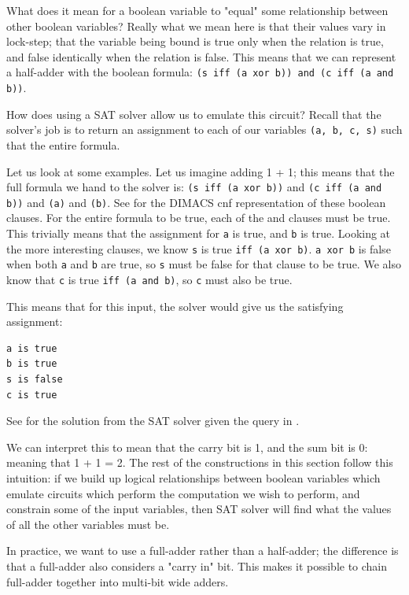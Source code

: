 What does it mean for a boolean variable to "equal" some relationship between other boolean variables? Really what we mean here is that their values vary in lock-step; that the variable being bound is true only when the relation is true, and false identically when the relation is false. This means that we can represent a half-adder with the boolean formula:
\texttt{(s iff (a xor b)) and (c iff (a and b))}.

How does using a SAT solver allow us to emulate this circuit? Recall that the solver's job is to return an assignment to each of our variables \texttt{(a, b, c, s)} such that the entire formula.

Let us look at some examples. Let us imagine adding 1 + 1; this means that the full formula we hand to the solver is:
\texttt{(s iff (a xor b))} and \texttt{(c iff (a and b))} and \texttt{(a)} and \texttt{(b)}. See  for the DIMACS cnf representation of these boolean clauses.
For the entire formula to be true, each of the and clauses must be true. This trivially means that the assignment for \texttt{a} is true, and \texttt{b} is true. Looking at the more interesting clauses, we know \texttt{s} is true \texttt{iff (a xor b)}. \texttt{a xor b} is false when both \texttt{a} and \texttt{b} are true, so \texttt{s} must be false for that clause to be true. We also know that \texttt{c} is true \texttt{iff (a and b)}, so \texttt{c} must also be true.

This means that for this input, the solver would give us the satisfying assignment:
\begin{verbatim}
a is true
b is true
s is false
c is true
\end{verbatim}

See  for the solution from the SAT solver given the query in .

We can interpret this to mean that the carry bit is 1, and the sum bit is 0: meaning that 1 + 1 = 2. The rest of the constructions in this section follow this intuition: if we build up logical relationships between boolean variables which emulate circuits which perform the computation we wish to perform, and constrain some of the input variables, then SAT solver will find what the values of all the other variables must be.

In practice, we want to use a full-adder rather than a half-adder; the difference is that a full-adder also considers a "carry in" bit. This makes it possible to chain full-adder together into multi-bit wide adders.

